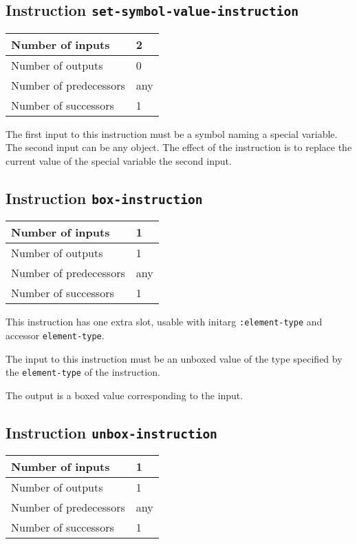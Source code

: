 \subsection{Instruction \texttt{set-symbol-value-instruction}}
\label{hir-instruction-set-symbol-value}

\begin{tabular}{|l|l|}
\hline
Number of inputs & 2\\
\hline
Number of outputs & 0\\
\hline
Number of predecessors & any\\
\hline
Number of successors & 1\\
\hline
\end{tabular}

The first input to this instruction must be a symbol naming a
special variable.  The second input can be any object.  The effect of
the instruction is to replace the current value of the special
variable the second input.

\subsection{Instruction \texttt{box-instruction}}
\label{hir-instruction-box}

\begin{tabular}{|l|l|}
  \hline
  Number of inputs & 1\\
  \hline
  Number of outputs & 1\\
  \hline
  Number of predecessors & any\\
  \hline
  Number of successors & 1\\
  \hline
\end{tabular}

This instruction has one extra slot, usable with initarg
\texttt{:element-type} and accessor \texttt{element-type}.

The input to this instruction must be an unboxed value of the type
specified by the \texttt{element-type} of the instruction.

The output is a boxed value corresponding to the input.

\subsection{Instruction \texttt{unbox-instruction}}
\label{hir-instruction-unbox}

\begin{tabular}{|l|l|}
\hline
Number of inputs & 1\\
\hline
Number of outputs & 1\\
\hline
Number of predecessors & any\\
\hline
Number of successors & 1\\
\hline
\end{tabular}

